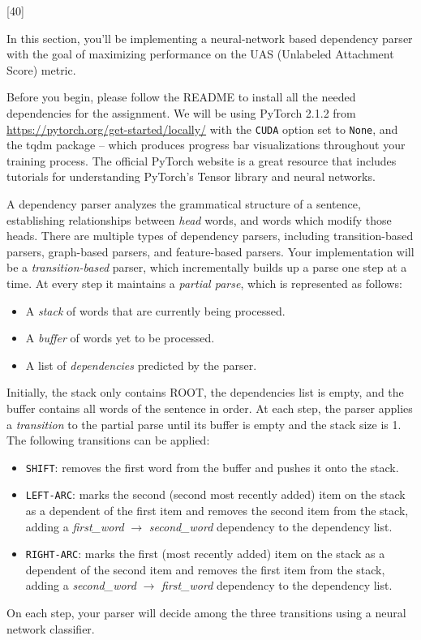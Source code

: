 [40]

In this section, you'll be implementing a neural-network based dependency parser with the goal of maximizing performance on the UAS (Unlabeled Attachment Score) metric.\newline

Before you begin, please follow the README to install all the needed dependencies for the assignment. We will be using PyTorch 2.1.2 from \url{https://pytorch.org/get-started/locally/} with the \texttt{CUDA} option set to \texttt{None}, and the tqdm package -- which produces progress bar visualizations throughout your training process. The official PyTorch website is a great resource that includes tutorials for understanding PyTorch's Tensor library and neural networks. \newline

A dependency parser analyzes the grammatical structure of a sentence, establishing relationships between \textit{head} words, and words which modify those heads. There are multiple types of dependency parsers, including transition-based parsers, graph-based parsers, and feature-based parsers. Your implementation will be a {\it transition-based} parser, which incrementally builds up a parse one step at a time. At every step it maintains a \textit{partial parse}, which is represented as follows:
\begin{itemize}
\item A {\it stack} of words that are currently being processed.
\item A {\it buffer} of words yet to be processed.
\item A list of {\it dependencies} predicted by the parser.
\end{itemize}
Initially, the stack only contains ROOT, the dependencies list is empty, and the buffer contains all words of the sentence in order. At each step, the parser applies a {\it transition} to the partial parse until its buffer is empty and the stack size is 1. The following transitions can be applied:
\begin{itemize}
\item \texttt{SHIFT}: removes the first word from the buffer and pushes it onto the stack.
\item \texttt{LEFT-ARC}: marks the second (second most recently added) item on the stack as a dependent of the first item and removes the second item from the stack, adding a \textit{first\_word} $\rightarrow$ \textit{second\_word} dependency to the dependency list.
\item \texttt{RIGHT-ARC}: marks the first (most recently added) item on the stack as a dependent of the second item and removes the first item from the stack, adding a \textit{second\_word} $\rightarrow$ \textit{first\_word} dependency to the dependency list.
\end{itemize}
On each step, your parser will decide among the three transitions using a neural network classifier.

